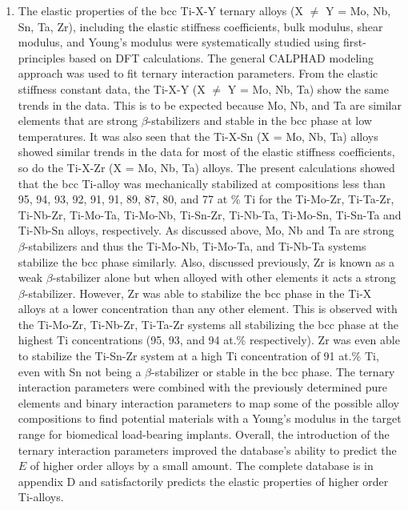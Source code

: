 \begin{enumerate}
	\item The elastic properties of the bcc Ti-X-Y ternary alloys (X $\neq$ Y = Mo, Nb, Sn, Ta, Zr), including the elastic stiffness coefficients, bulk modulus, shear modulus, and Young's modulus were systematically studied using first-principles based on DFT calculations. The general CALPHAD modeling approach was used to fit ternary interaction parameters. From the elastic stiffness constant data, the Ti-X-Y (X $\neq$ Y = Mo, Nb, Ta) show the same trends in the data. This is to be expected because Mo, Nb, and Ta are similar elements that are strong $\beta$-stabilizers and stable in the bcc phase at low temperatures. It was also seen that the Ti-X-Sn (X = Mo, Nb, Ta) alloys showed similar trends in the data for most of the elastic stiffness coefficients, so do the Ti-X-Zr (X = Mo, Nb, Ta) alloys. The present calculations showed that the bcc Ti-alloy was mechanically stabilized at compositions less than 95, 94, 93, 92, 91, 91, 89, 87, 80, and 77 at \% Ti for the Ti-Mo-Zr, Ti-Ta-Zr, Ti-Nb-Zr, Ti-Mo-Ta, Ti-Mo-Nb, Ti-Sn-Zr, Ti-Nb-Ta, Ti-Mo-Sn, Ti-Sn-Ta and Ti-Nb-Sn alloys, respectively. As discussed above, Mo, Nb and Ta are strong $\beta$-stabilizers and thus the Ti-Mo-Nb, Ti-Mo-Ta, and Ti-Nb-Ta systems stabilize the bcc phase similarly. Also, discussed previously, Zr is known as a weak $\beta$-stabilizer alone but when alloyed with other elements it acts a strong $\beta$-stabilizer. However, Zr was able to stabilize the bcc phase in the Ti-X alloys at a lower concentration than any other element. This is observed with the Ti-Mo-Zr, Ti-Nb-Zr, Ti-Ta-Zr systems all stabilizing the bcc phase at the highest Ti concentrations (95, 93, and 94 at.\% respectively). Zr was even able to stabilize the Ti-Sn-Zr system at a high Ti concentration of 91 at.\% Ti, even with Sn not being a $\beta$-stabilizer or stable in the bcc phase. The ternary interaction parameters were combined with the previously determined pure elements and binary interaction parameters to map some of the possible alloy compositions to find potential materials with a Young's modulus in the target range for biomedical load-bearing implants. Overall, the introduction of the ternary interaction parameters improved the database's ability to predict the $E$ of higher order alloys by a small amount. The complete database is in appendix D and satisfactorily predicts the elastic properties of higher order Ti-alloys.

\end{enumerate}
